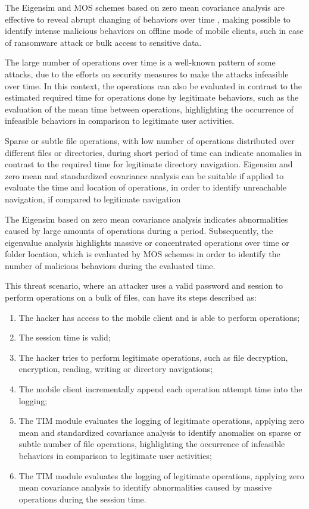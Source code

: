 The Eigensim and MOS schemes based on zero mean covariance analysis are effective to reveal abrupt changing of behaviors over time \cite{tenorio2013greatest}, making possible to identify intense malicious behaviors on offline mode of mobile clients, such in case of ransomware attack or bulk access to sensitive data.

The large number of operations over time is a well-known pattern of some attacks, due to the efforts on security measures to make the attacks infeasible over time. In this context, the operations can also be evaluated in contrast to the estimated required time for operations done by legitimate behaviors, such as the evaluation of the mean time between operations, highlighting the occurrence of infeasible behaviors in comparison to legitimate user activities.

Sparse or subtle file operations, with low number of operations distributed over different files or directories, during short period of time can indicate anomalies in contrast to the required time for legitimate directory navigation. Eigensim and zero mean and standardized covariance analysis can be suitable if applied to evaluate the time and location of operations, in order to identify unreachable navigation, if compared to legitimate navigation

The Eigensim based on zero mean covariance analysis indicates abnormalities caused by large amounts of operations during a period. Subsequently, the eigenvalue analysis highlights massive or concentrated operations over time or folder location, which is evaluated by MOS schemes in order to identify the number of malicious behaviors during the evaluated time.

This threat scenario, where an attacker uses a valid password and session to perform operations on a bulk of files, can have its steps described as:

\begin{enumerate}[label=(\alph*)]
	\item The hacker has access to the mobile client and is able to perform operations;
	\item The session time is valid;
	\item The hacker tries to perform legitimate operations, such as file decryption, encryption, reading, writing or directory navigations;
	\item The mobile client incrementally append each operation attempt time into the logging;
	\item The TIM module evaluates the logging of legitimate operations, applying zero mean and standardized covariance analysis to identify anomalies on sparse or subtle number of file operations, highlighting the occurrence of infeasible behaviors in comparison to legitimate user activities;
	\item The TIM module evaluates the logging of legitimate operations, applying zero mean covariance analysis to identify abnormalities caused by massive operations during the session time.
\end{enumerate}

